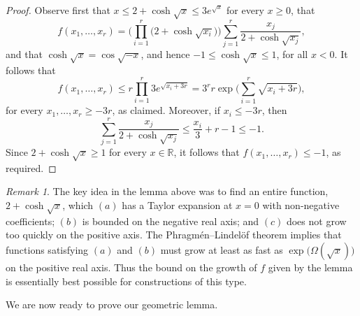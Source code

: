 \documentclass[12pt,reqno]{amsart}
\theoremstyle{definition}
\theoremstyle{remark}
\newtheorem{remark}[theorem]{Remark}
\newcommand\R{\mathbb{R}}
\renewcommand{\le}{\leqslant}
\renewcommand{\ge}{\geqslant}
\def\R{\mathbb{R}}
\begin{document}
\begin{proof}
Observe first that $x \le 2 + \cosh\sqrt{x} \le 3e^{\sqrt{x}}$ for every $x \ge 0$, 
that 
$$f(x_1,\dots,x_r) = \bigg( \prod_{i = 1}^r \big( 2 + \cosh \sqrt{x_i} \big) \bigg) \sum_{j = 1}^r \frac{x_j}{2+\cosh\sqrt{x_j}},$$
and that $\cosh \sqrt{x} = \cos \sqrt{-x}$, and hence $-1 \le \cosh \sqrt{x} \le 1$, for all $x < 0$. It follows that
$$f(x_1,\dots,x_r)\le r \prod_{i=1}^r 3e^{\sqrt{x_i + 3r}} =3^r r \exp\bigg(\sum_{i=1}^r \sqrt{x_i + 3r} \bigg),$$
for every $x_1,\ldots,x_r \ge -3r$, as claimed. Moreover, if $x_i \le -3r$, then
$$\sum_{j = 1}^r \frac{x_j}{2+\cosh\sqrt{x_j}} \le \frac{x_i}{3} + r - 1 \le - 1.$$
Since $2 + \cosh \sqrt{x} \ge 1$ for every $x \in \R$, it follows that $f(x_1,\dots,x_r) \le -1$, as required. 
\end{proof}

\pagebreak

\begin{remark}
The key idea in the lemma above was to find an entire function, $2 + \cosh\sqrt{x}$, which $(a)$ has a Taylor expansion at $x = 0$ with non-negative coefficients; $(b)$ is bounded on the negative real axis; and $(c)$ does not grow too quickly on the positive axis. The Phragm\'en--Lindel\"of theorem %
implies that functions satisfying $(a)$ and $(b)$ must grow at least as fast as $\exp\big( \Omega(\sqrt{x}) \big)$ on the positive real axis.  Thus the bound on the growth of $f$ given by the lemma is essentially best possible for constructions of this type.
\end{remark}

We are now ready to prove our geometric lemma. 
\end{document}
